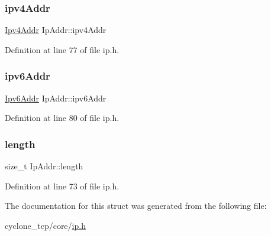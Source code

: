 \mbox{\label{structIpAddr_a8de6f49cb0461f57c1eda49bb1088916}} 
\subsubsection{\texorpdfstring{ipv4\+Addr}{ipv4Addr}}
{\footnotesize\ttfamily \hyperlink{ipv4_8h_a411debb3d770caa0c06d3f73367da37f}{Ipv4\+Addr} Ip\+Addr\+::ipv4\+Addr}



Definition at line 77 of file ip.\+h.

\mbox{\label{structIpAddr_a9bc2340a9c0bc5a0b8aa9695b74e2ee6}} 
\subsubsection{\texorpdfstring{ipv6\+Addr}{ipv6Addr}}
{\footnotesize\ttfamily \hyperlink{ipv6_8h_aed0cbc40c61ed5b4fb681ebc55237e89}{Ipv6\+Addr} Ip\+Addr\+::ipv6\+Addr}



Definition at line 80 of file ip.\+h.

\mbox{\label{structIpAddr_ae61478bd1e79361fca7dd04a21aeb2f8}} 
\subsubsection{\texorpdfstring{length}{length}}
{\footnotesize\ttfamily size\+\_\+t Ip\+Addr\+::length}



Definition at line 73 of file ip.\+h.



The documentation for this struct was generated from the following file\+:\begin{DoxyCompactItemize}
\item 
cyclone\+\_\+tcp/core/\hyperlink{ip_8h}{ip.\+h}\end{DoxyCompactItemize}

